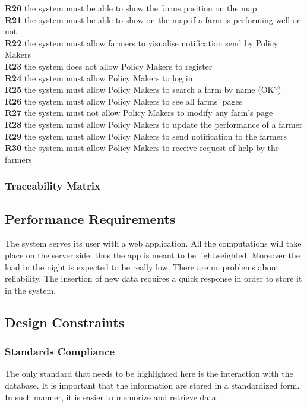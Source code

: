 \textbf{R20} the system must be able to show the farms position on the map\\
\textbf{R21} the system must be able to show on the map if a farm is performing well or not \\
\textbf{R22} the system must allow farmers to visualise notification send by Policy Makers\\
\textbf{R23} the system does not allow Policy Makers to register\\
\textbf{R24} the system must allow Policy Makers to log in\\
\textbf{R25} the system must allow Policy Makers to search a farm by name (OK?)\\
\textbf{R26} the system must allow Policy Makers to see all farms’ pages\\
\textbf{R27} the system must not allow Policy Makers to modify any farm’s page\\
\textbf{R28} the system must allow Policy Makers to update the performance of a farmer\\
\textbf{R29} the system must allow Policy Makers to send notification to the farmers\\
\textbf{R30} the system must allow Policy Makers to receive request of help by the farmers\\
\subsubsection{Traceability Matrix}

\subsection{Performance Requirements}
The system serves its user with a web application. All the computations will take place on the server side, 
thus the app is meant to be lightweighted. Moreover the load in the night is expected to be really low.
There are no problems about reliability. The insertion of new data requires a quick response in order to store 
it in the system.

\subsection{Design Constraints}
\subsubsection{Standards Compliance}
The only standard that needs to be highlighted here is the interaction with the database. It is important that the information are stored 
in a standardized form. In such manner, it is easier to memorize and retrieve data.


